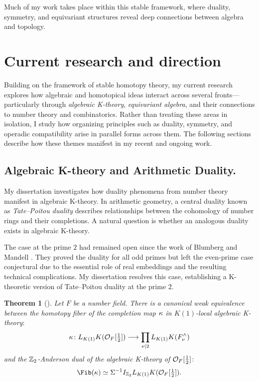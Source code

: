 \documentclass[11pt]{article}
\newtheorem{theorem}{Theorem}
\begin{document}
Much of my work takes place within this stable framework, where duality, symmetry, and equivariant structures reveal deep connections between algebra and topology.

\section{Current research and direction}
Building on the framework of stable homotopy theory, my current research explores how algebraic and homotopical ideas interact across several fronts—particularly through {\it algebraic K-theory}, {\it equivariant algebra}, and their connections to number theory and combinatorics.
Rather than treating these areas in isolation, I study how organizing principles such as duality, symmetry, and operadic compatibility arise in parallel forms across them.
The following sections describe how these themes manifest in my recent and ongoing work.


\subsection{Algebraic K-theory and Arithmetic Duality.}
My dissertation investigates how duality phenomena from number theory manifest in algebraic K-theory.
In arithmetic geometry, a central duality known as {\it Tate–Poitou duality} describes relationships between the cohomology of number rings and their completions. 
A natural question is whether an analogous duality exists in algebraic K-theory.

The case at the prime $2$ had remained open since the work of Blumberg and Mandell \cite{MR4121155}. 
They proved the duality for all odd primes but left the even-prime case conjectural due to the essential role of real embeddings and the resulting technical complications.
My dissertation resolves this case, establishing a K-theoretic version of Tate–Poitou duality at the prime $2$.

\begin{theorem}[\cite{Cho}]
Let $F$ be a number field.
There is a canonical weak equivalence between  the {\it homotopy fiber of the completion map} $\kappa$ in $K(1)$-local algebraic K-theory$\colon$
\[\kappa\colon L_{K(1)}K({\mathcal{O}}_F[\tfrac{1}{2}]) \longrightarrow \prod_{\nu \mid 2} L_{K(1)}K(F_\nu^\wedge)\]
and the $\mathbb{Z}_2$-Anderson dual of the algebraic K-theory of ${\mathcal{O}}_F[\tfrac{1}{2}]\colon$
 \begin{equation}\label{fib}
 \Fib(\ka) \simeq \SI^{-1} I_{\bZ_2} L_{K(1)}K(\calO_F[\tfrac{1}{2}]).
\end{equation}
\end{theorem}
\end{document}
